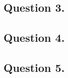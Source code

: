 \documentclass{mhk}
\begin{document}
\subsection*{Question 3.}







\subsection*{Question 4.}






\subsection*{Question 5.}




\end{document}
